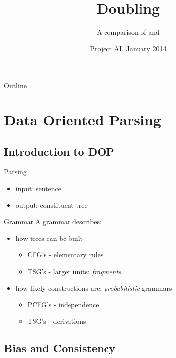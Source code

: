 \documentclass{beamer}
\title{Doubling \dops}
\subtitle{ A comparison of \ddop{} and \dops{}}
\author[Kruit, Veldhoen]{Benno Kruit\and Sara Veldhoen{\\\small Supervised by: \\Andras van Cranenburg \and Khalil Sima'an}}
\institute{University of Amsterdam (UvA)}
\date{Project AI, January 2014}
\begin{document}
\begin{frame}
  \titlepage
\end{frame}

\begin{frame}{Outline}
  \tableofcontents   %
\end{frame}

\section{Data Oriented Parsing}

\subsection{Introduction to DOP}

\begin{frame}{Parsing}%

  \begin{itemize}
  \item input: sentence \pause
  \item output: constituent tree
  \end{itemize}
\end{frame}

\begin{frame}{Grammar}
A grammar describes:
\begin{itemize}
\item how trees can be built
\begin{itemize} 
\item CFG's - elementary rules
\item TSG's  - larger units: \emph{fragments}
\end{itemize}
\item how likely constructions are: \emph{probabilistic} grammars
\begin{itemize} 
\item PCFG's - independence 
\item TSG's  - derivations
\end{itemize}

\end{itemize}
\end{frame}


\subsection{Bias and Consistency}
\end{document}
